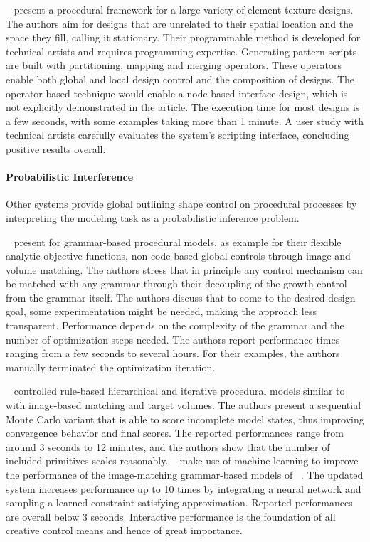 \citeauthor*{loi_2017_pae}~\cite{loi_2017_pae} present a procedural framework for a large variety of element texture designs. The authors aim for designs that are unrelated to their spatial location and the space they fill, calling it stationary. Their programmable method is developed for technical artists and requires programming expertise. Generating pattern scripts are built with partitioning, mapping and merging operators. These operators enable both global and local design control and the composition of designs. The operator-based technique would enable a node-based interface design, which is not explicitly demonstrated in the article. The execution time for most designs is a few seconds, with some examples taking more than 1 minute. A user study with technical artists carefully evaluates the system's scripting interface, concluding positive results overall.

\paragraph*{Probabilistic Interference}
\label{para:analysis_rulebased_shapes_probabilistic}

Other systems provide global outlining shape control on procedural processes by interpreting the modeling task as a probabilistic inference problem.

\citeauthor*{talton_2011_mpm}~\cite{talton_2011_mpm} present for grammar-based procedural models, as example for their flexible analytic objective functions, non code-based global controls through image and volume matching. The authors stress that in principle any control mechanism can be matched with any grammar through their decoupling of the growth control from the grammar itself. The authors discuss that to come to the desired design goal, some experimentation might be needed, making the approach less transparent. Performance depends on the complexity of the grammar and the number of optimization steps needed. The authors report performance times ranging from a few seconds to several hours. For their examples, the authors manually terminated the optimization iteration.

\citeauthor*{ritchie_2015_cpm}~\cite{ritchie_2015_cpm} controlled rule-based hierarchical and iterative procedural models similar to \citeauthor*{talton_2011_mpm}~\cite{talton_2011_mpm} with image-based matching and target volumes. The authors present a sequential Monte Carlo variant that is able to score incomplete model states, thus improving convergence behavior and final scores. The reported performances range from around 3 seconds to 12 minutes, and the authors show that the number of included primitives scales reasonably. \citeauthor*{ritchie_2016_ngp}~\cite{ritchie_2016_ngp} make use of machine learning to improve the performance of the image-matching grammar-based models of \citeauthor*{ritchie_2015_cpm}~\cite{ritchie_2015_cpm}. The updated system increases performance up to 10 times by integrating a neural network and sampling a learned constraint-satisfying approximation. Reported performances are overall below 3 seconds. Interactive performance is the foundation of all creative control means and hence of great importance.

